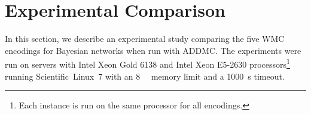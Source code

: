 \documentclass{article}
\begin{document}
\section{Experimental Comparison} \label{sec:experiments}

In this section, we describe an experimental study comparing the five WMC
encodings for Bayesian networks when run with ADDMC. The experiments were run on
servers with Intel Xeon Gold 6138 and Intel Xeon E5-2630
processors\footnote{Each instance is run on the same processor for all
  encodings.} running Scientific~Linux~7 with an \SI{8}{\gibi\byte} memory limit
and a \SI{1000}{\second} timeout.
\end{document}
